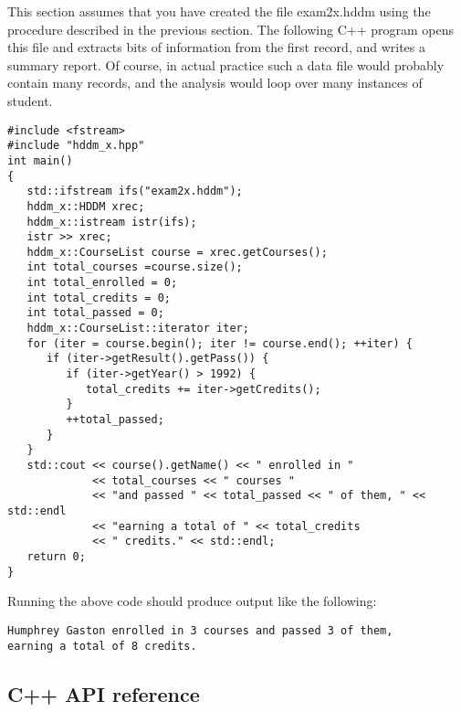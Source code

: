\documentclass{revtex4}
\begin{document}
This section assumes that you have created the file exam2x.hddm using the
procedure described in the previous section. The following C++ program 
opens this file and extracts bits of information from the first record,
and writes a summary report. Of course, in actual practice such a data
file would probably contain many records, and the analysis would loop
over many instances of student.

\vspace{0.5cm}
\begin{minipage}{12cm}
\begin{verbatim}
#include <fstream>
#include "hddm_x.hpp"
int main()
{
   std::ifstream ifs("exam2x.hddm");
   hddm_x::HDDM xrec;
   hddm_x::istream istr(ifs);
   istr >> xrec;
   hddm_x::CourseList course = xrec.getCourses();
   int total_courses =course.size();
   int total_enrolled = 0;
   int total_credits = 0;
   int total_passed = 0;
   hddm_x::CourseList::iterator iter;
   for (iter = course.begin(); iter != course.end(); ++iter) {
      if (iter->getResult().getPass()) {
         if (iter->getYear() > 1992) {
            total_credits += iter->getCredits();
         }
         ++total_passed;
      }
   }
   std::cout << course().getName() << " enrolled in "
             << total_courses << " courses "
             << "and passed " << total_passed << " of them, " << std::endl
             << "earning a total of " << total_credits
             << " credits." << std::endl;
   return 0;
}
\end{verbatim}
\end{minipage}
\vspace{0.5cm}

Running the above code should produce output like the following:

\vspace{0.5cm}
\begin{minipage}{12cm}
\begin{verbatim}
Humphrey Gaston enrolled in 3 courses and passed 3 of them,
earning a total of 8 credits.
\end{verbatim}
\end{minipage}
\vspace{0.5cm}

\subsection{C++ API reference}
\end{document}
